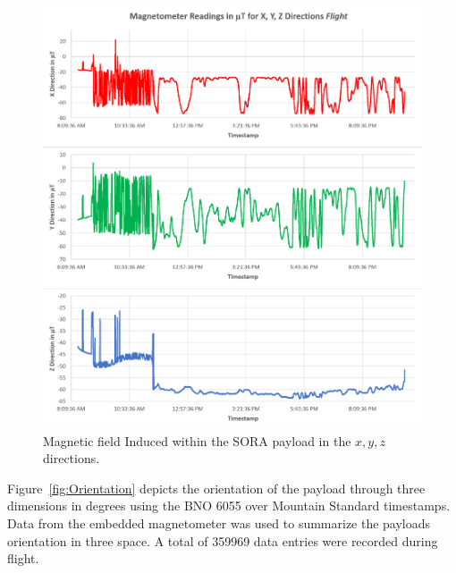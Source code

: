\begin{figure}[H]
\centering
\includegraphics[width=\textwidth]{./Figures/magnetometer.png}
\caption{Magnetic field Induced within the SORA payload in the $x, y, z$ directions.}
\label{fig:Magnetometer} 
\end{figure}
\clearpage

Figure~\ref{fig:Orientation} depicts the orientation of the payload through three dimensions in degrees using the BNO 6055 over Mountain Standard timestamps.  Data from the embedded magnetometer was used to summarize the payloads orientation in three space.  A total of \num{359969} data entries were recorded during flight. 

